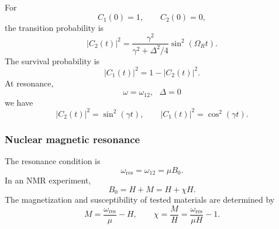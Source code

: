 For
\begin{equation}
 C_1(0)=1,
 \qquad C_2(0)=0,
\end{equation}
the transition probability is
\begin{equation}
 \boxed{
 |C_2(t)|^2
 =\frac{\gamma^2}{\gamma^2+\Delta^2/4}
 \sin^2\left(\Omega_Rt\right).}
\end{equation}
The survival probability is
\begin{equation}
 |C_1(t)|^2=1-|C_2(t)|^2.
\end{equation}
At resonance,
\begin{equation}
 \omega=\omega_{12},~~~\Delta=0
\end{equation}
we have 
\begin{equation}
 \boxed{|C_2(t)|^2=\sin^2(\gamma t),
 \qquad |C_1(t)|^2=\cos^2(\gamma t).}
\end{equation}

\subsubsection{Nuclear magnetic resonance}
The resonance condition is
\begin{equation}
 \boxed{\omega_{\mathrm{res}}=\omega_{12}=\mu B_0.}
\end{equation}
In an NMR experiment,
\begin{equation}
 B_0=H+M=H+\chi H.
\end{equation}
The magnetization and susceptibility of tested materials are determined by 
\begin{equation}
 M=\frac{\omega_{\mathrm{res}}}{\mu}-H,
 \qquad
 \chi=\frac{M}{H}=\frac{\omega_{\mathrm{res}}}{\mu H}-1.
\end{equation}